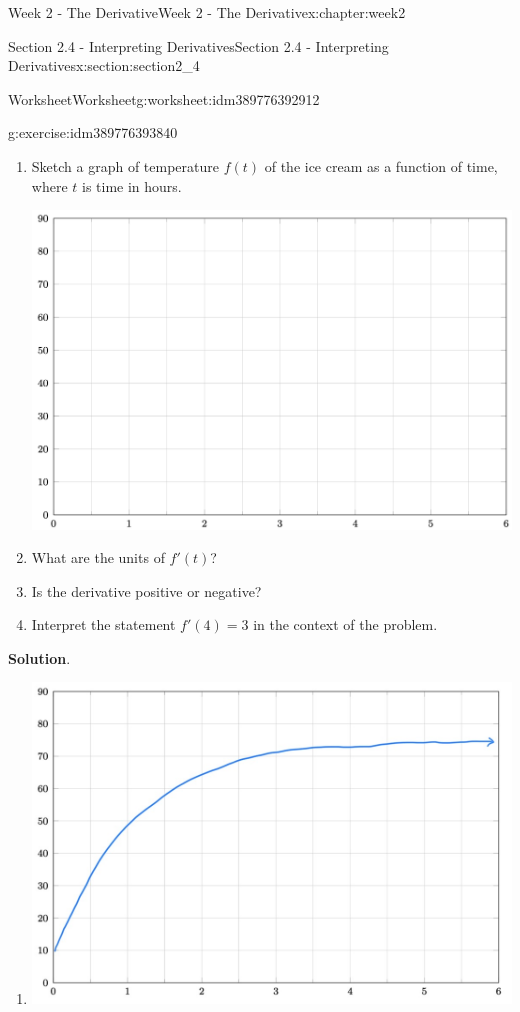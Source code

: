 \documentclass[oneside,10pt,]{book}
\newcommand{\blocktitlefont}{\relax}
\numberwithin{equation}{section}
\begin{document}
\begin{chapterptx}{Week 2 - The Derivative}{}{Week 2 - The Derivative}{}{}{x:chapter:week2}
\begin{sectionptx}{Section 2.4 - Interpreting Derivatives}{}{Section 2.4 - Interpreting Derivatives}{}{}{x:section:section2_4}
\begin{worksheet-subsection}{Worksheet}{}{Worksheet}{}{}{g:worksheet:idm389776392912}
\begin{divisionexercise}{1}{}{}{g:exercise:idm389776393840}
\begin{enumerate}[label=(\alph*)]
\item{}Sketch a graph of temperature \(f(t)\) of the ice cream as a function of time, where \(t\) is time in hours.%
\par
\begin{image}{0}{1}{0}%
\includegraphics[width=\linewidth]{images/Math140WkshtInterpretingDerivativesG1.png}
\end{image}%
%
\item{}What are the units of \(f'(t)\)?%
\item{}Is the derivative positive or negative?%
\item{}Interpret the statement \(f'(4)=3\) in the context of the problem.%
\end{enumerate}
\textbf{\blocktitlefont Solution}.\hypertarget{g:solution:idm389776434304}{}\quad{}%
\begin{enumerate}[label=(\alph*)]
\item{}\begin{image}{0}{1}{0}%
\includegraphics[width=\linewidth]{images/Math140WkshtInterpretingDerivativesG2.JPG}

\end{image}
\end{enumerate}
\end{divisionexercise}
\end{worksheet-subsection}
\end{sectionptx}
\end{chapterptx}
\end{document}
